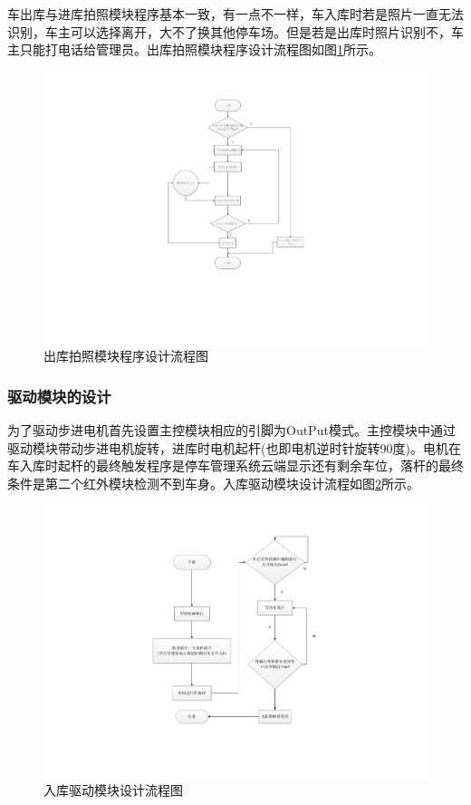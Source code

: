 车出库与进库拍照模块程序基本一致，有一点不一样，车入库时若是照片一直无法识别，车主可以选择离开，大不了换其他停车场。但是若是出库时照片识别不，车主只能打电话给管理员。出库拍照模块程序设计流程图如图\ref{fig:出库拍照模块程序设计流程图}所示。

\begin{figure}[htbp]
	\centering
	\includegraphics[width=\textwidth]{figure/software-4.pdf}
	\caption{出库拍照模块程序设计流程图}\label{fig:出库拍照模块程序设计流程图}
\end{figure}

\subsubsection{驱动模块的设计}
为了驱动步进电机首先设置主控模块相应的引脚为OutPut模式。主控模块中通过驱动模块带动步进电机旋转，进库时电机起杆(也即电机逆时针旋转90度)。电机在车入库时起杆的最终触发程序是停车管理系统云端显示还有剩余车位，落杆的最终条件是第二个红外模块检测不到车身。入库驱动模块设计流程如图\ref{fig:入库驱动模块设计流程图}所示。

\begin{figure}[htbp]
	\centering
	\includegraphics[width=\textwidth]{figure/software-5.pdf}
	\caption{入库驱动模块设计流程图}\label{fig:入库驱动模块设计流程图}
\end{figure}

